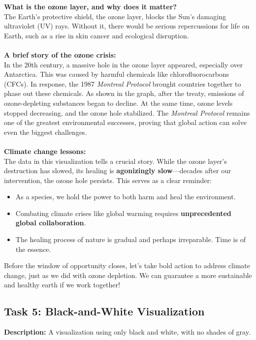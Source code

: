 \documentclass[a4paper,landscape]{article}
\begin{document}
\textbf{What is the ozone layer, and why does it matter?}  \\
The Earth's protective shield, the ozone layer, blocks the Sun's damaging ultraviolet (UV) rays. Without it, there would be serious repercussions for life on Earth, such as a rise in skin cancer and ecological disruption. \\ \\ 
\textbf{A brief story of the ozone crisis:} \\
In the 20th century, a massive hole in the ozone layer appeared, especially over Antarctica. This was caused by harmful chemicals like chlorofluorocarbons (CFCs). In response, the 1987 \textit{Montreal Protocol} brought countries together to phase out these chemicals.
As shown in the graph, after the treaty, emissions of ozone-depleting substances began to decline. At the same time, ozone levels stopped decreasing, and the ozone hole stabilized.
The \textit{Montreal Protocol} remains one of the greatest environmental successes, proving that global action can solve even the biggest challenges. \\ \\
\textbf{Climate change lessons:} \\
The data in this visualization tells a crucial story. While the ozone layer’s destruction has slowed, its healing is \textbf{agonizingly slow}—decades after our intervention, the ozone hole persists. This serves as a clear reminder:  
\begin{itemize}
    \item As a species, we hold the power to both harm and heal the environment.
    \item Combating climate crises like global warming requires \textbf{unprecedented global collaboration}.
    \item The healing process of nature is gradual and perhaps irreparable. Time is of the essence.
\end{itemize}
Before the window of opportunity closes, let's take bold action to address climate change, just as we did with ozone depletion. We can guarantee a more sustainable and healthy earth if we work together!


\subsection{Task 5: Black-and-White Visualization}
\textbf{Description:} A visualization using only black and white, with no shades of gray.
\end{document}
